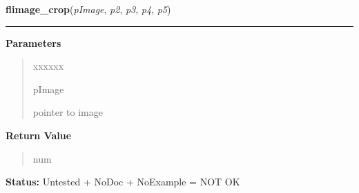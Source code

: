 \hspace{.8\funcindent}\begin{boxedminipage}{\funcwidth}

    \raggedright \textbf{flimage\_crop}(\textit{pImage}, \textit{p2}, \textit{p3}, \textit{p4}, \textit{p5})

    \vspace{-1.5ex}

    \rule{\textwidth}{0.5\fboxrule}
\setlength{\parskip}{2ex}
\setlength{\parskip}{1ex}
      \textbf{Parameters}
      \vspace{-1ex}

      \begin{quote}
        \begin{Ventry}{xxxxxx}

          \item[pImage]

          pointer to image

        \end{Ventry}

      \end{quote}

      \textbf{Return Value}
    \vspace{-1ex}

      \begin{quote}
      num

      \end{quote}

\textbf{Status:} Untested + NoDoc + NoExample = NOT OK



    \end{boxedminipage}

    \label{xformslib:library:flimage_replace_pixel}

    \vspace{0.5ex}


